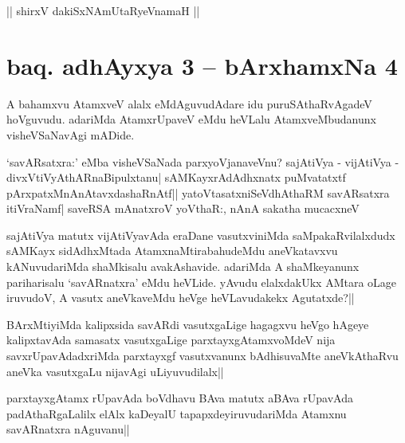 \begin{center}
|| shirxV dakiSxNAmUtaRyeVnamaH ||
\end{center}

\section*{baq. adhAyxya 3 -- bArxhamxNa 4}




\begin{artha}
A bahamxvu AtamxveV alalx eMdAguvudAdare idu puruSAthaRvAgadeV hoVguvudu. adariMda AtamxrUpaveV eMdu heVLalu 
AtamxveMbudanunx visheVSaNavAgi mADide.

`savARsatxra:' eMba visheVSaNada parxyoVjanaveVnu? sajAtiVya - vijAtiVya - divxVtiVyAthARnaBipulxtanu|
sAMKayxrAdAdhxnatx puMvatatxtf pArxpatxMnAnAtavxdashaRnAtf|| yatoV\s tasatxniSeVdhAthaRM savARsatxra itiVraNamf|
saveRSA mAnatxroV yoV\s thaR:, nAnA sakatha mucacxneV 

sajAtiVya matutx vijAtiVyavAda eraDane vasutxviniMda saMpakaRvilalxdudx sAMKayx sidAdhxMtada AtamxnaMtirabahudeMdu
aneVkatavxvu kANuvudariMda shaMkisalu avakAshavide. adariMda A shaMkeyanunx pariharisalu `savARnatxra' eMdu heVLide. yAvudu elalxdakUkx AMtara oLage iruvudoV, A vasutx aneVkaveMdu heVge heVLavudakekx Agutatxde?||
\end{artha}


\begin{artha}%
BArxMtiyiMda kalipxsida savARdi vasutxgaLige hagagxvu heVgo hAgeye kalipxtavAda samasatx vasutxgaLige parxtayxgAtamxvoMdeV nija savxrUpavAdadxriMda parxtayxgf vasutxvanunx bAdhisuvaMte 
aneVkAthaRvu aneVka vasutxgaLu nijavAgi uLiyuvudilalx||
\end{artha}


\begin{artha}
parxtayxgAtamx rUpavAda boVdhavu BAva matutx aBAva rUpavAda padAthaRgaLalilx elAlx kaDeyalU tapapxdeyiruvudariMda 
Atamxnu savARnatxra nAguvanu||
\end{artha}


